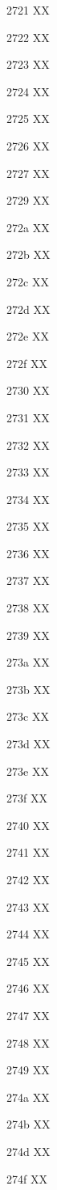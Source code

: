 \documentclass[11pt]{article}
\begin{document}
2721 X{}X

2722 X{}X

2723 X{}X

2724 X{}X

2725 X{}X

2726 X{}X

2727 X{}X

2729 X{}X

272a X{}X

272b X{}X

272c X{}X

272d X{}X

272e X{}X

272f X{}X

2730 X{}X

2731 X{}X

2732 X{}X

2733 X{}X

2734 X{}X

2735 X{}X

2736 X{}X

2737 X{}X

2738 X{}X

2739 X{}X

273a X{}X

273b X{}X

273c X{}X

273d X{}X

273e X{}X

273f X{}X

2740 X{}X

2741 X{}X

2742 X{}X

2743 X{}X

2744 X{}X

2745 X{}X

2746 X{}X

2747 X{}X

2748 X{}X

2749 X{}X

274a X{}X

274b X{}X

274d X{}X

274f X{}X
\end{document}

